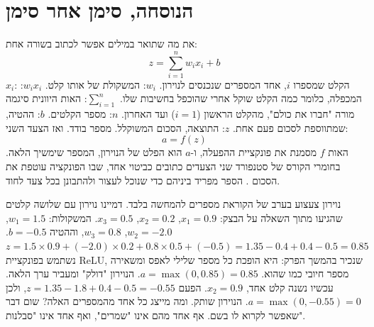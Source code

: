 \section{הנוסחה, סימן אחר סימן}
את מה שתואר במילים אפשר לכתוב בשורה אחת:
\begin{equation}
z = \sum_{i=1}^{n} w_i x_i + b
\end{equation}
$x_i$: הקלט שמספרו $i$, אחד המספרים שנכנסים לנוירון. $w_i$: המשקולת של אותו קלט. $w_i x_i$: המכפלה, כלומר כמה הקלט שוקל אחרי שהוכפל בחשיבות שלו. $\sum_{i=1}^{n}$: האות היוונית סיגמה מורה "חברו את כולם", מהקלט הראשון ($i = 1$) ועד האחרון. $n$: מספר הקלטים. $b$: ההטיה, שמתווספת לסכום פעם אחת. $z$: התוצאה, הסכום המשוקלל. מספר בודד.
ואז הצעד השני:
\begin{equation}
a = f(z)
\end{equation}
האות $f$ מסמנת את פונקציית ההפעלה, ו-$a$ הוא הפלט של הנוירון, המספר שימשיך הלאה. בחומרי הקורס של סטנפורד שני הצעדים כתובים כביטוי אחד, שבו הפונקציה עוטפת את הסכום \cite{S-ch03-01}. הספר מפריד ביניהם כדי שנוכל לעצור ולהתבונן בכל צעד לחוד.
\begin{labbox}{נוירון צעצוע בערב של הקוראת}
מספרים להמחשה בלבד. דמיינו נוירון עם שלושה קלטים שהגיעו מתוך השאלה על הבצק: $x_1 = 0.9$, $x_2 = 0.2$, $x_3 = 0.5$. המשקולות: $w_1 = 1.5$, $w_2 = -2.0$, $w_3 = 0.8$, וההטיה $b = -0.5$.
$z = 1.5\times0.9 + (-2.0)\times0.2 + 0.8\times0.5 + (-0.5) = 1.35 - 0.4 + 0.4 - 0.5 = 0.85$
נשתמש בפונקציית ReLU, שנכיר בהמשך הפרק: היא הופכת כל מספר שלילי לאפס ומשאירה מספר חיובי כמו שהוא. $a = \max(0, 0.85) = 0.85$. הנוירון "דולק" ומעביר ערך הלאה.
עכשיו נשנה קלט אחד, $x_2 = 0.9$. הפעם $z = 1.35 - 1.8 + 0.4 - 0.5 = -0.55$, ולכן $a = \max(0, -0.55) = 0$. הנוירון שותק.
ומה מייצג כל אחד מהמספרים האלה? שום דבר שאפשר לקרוא לו בשם. אף אחד מהם אינו "שמרים", ואף אחד אינו "סבלנות".
\end{labbox}
